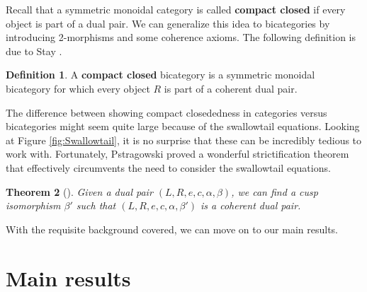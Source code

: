 \documentclass[11pt]{amsart}
\newtheorem{thm}{Theorem}[section]
\theoremstyle{remark}
\theoremstyle{definition}
\newtheorem{defn}[thm]{Definition}
\begin{document}
Recall that a symmetric monoidal category is called 
\textbf{compact closed} if every object is part of a dual pair. 
We can generalize this idea to bicategories by 
introducing 2-morphisms and some coherence axioms. 
The following definition is due to Stay 
	\cite{Stay}.

\begin{defn}
	\label{def:CompClosdBicat}
	A \textbf{compact closed} bicategory is a symmetric monoidal bicategory for which
	every object $R$ 
	is part of a coherent dual pair. 
\end{defn}

The difference between showing compact closededness 
in categories versus bicategories might seem quite large 
because of the swallowtail equations.  
Looking at Figure 
	\ref{fig:Swallowtail}, 
it is no surprise that these can be incredibly tedious to work with.  
Fortunately, Pstragowski \cite{Piotr} proved a wonderful strictification theorem 
that effectively circumvents the need to consider the swallowtail equations.  

\begin{thm}[{\cite[p.~22]{Piotr}}]
	\label{thm:StrictingDualPairs}
	Given a dual pair $(L,R,e,c,\alpha,\beta)$, 
	we can find a cusp isomorphism $\beta'$ such that
	 $(L,R,e,c,\alpha,\beta')$ is a coherent dual pair.
\end{thm}

With the requisite background covered,
we can move on to our main results.

\section{Main results} %
\label{sec:SpansCospans}
\end{document}
